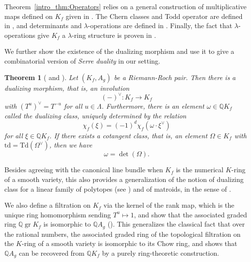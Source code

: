\documentclass[oneside]{amsart}
\theoremstyle{plain}
\newtheorem{theorem}{Theorem}[section]
\theoremstyle{definition}
\newcommand{\Q}{{\mathbb{Q}}}
\newcommand{\gr}{\operatorname{gr}}
\newcommand{\td}{{\mathrm{td}}}
\newcommand{\Td}{{\mathrm{Td}}}
\begin{document}
Theorem~\ref{intro_thm:Operators} relies on a general construction of multiplicative maps defined on $K_f$ given in  . The Chern classes and Todd operator are defined in , and determinants and $\lambda$-operations are defined in . Finally, the fact that $\lambda$-operations give $K_f$ a $\lambda$-ring structure is proven in .

We further show the existence of the dualizing morphism and use it to give a combinatorial version of \emph{Serre duality} in our setting.
\begin{theorem}[{ and }]\label{intro_thm:Serre-duality}
    Let $(K_f, A_g)$ be a Riemann-Roch pair. Then there is a \emph{dualizing morphism}, that is, an involution
    \[
        (-)^\vee \colon K_f\to K_f
    \]
    with $(T^u)^\vee=T^{-u}$ for all $u\in \Lambda$.
    Furthermore, there is an element $\omega \in \Q K_f$ called the \emph{dualizing class}, uniquely determined by the relation
    \[
        \chi_f(\xi) = (-1)^d\chi_f(\omega \cdot \xi^\vee)
    \]
    for all $\xi\in \Q K_f$.
    If there exists a \emph{cotangent class}, that is, an element $\Omega\in K_f$ with $\td=\Td(\Omega^\vee)$,
    then we have 
    \[
    \omega=\det(\Omega).
    \]
\end{theorem}
Besides agreeing with the canonical line bundle when $K_f$ is the numerical $K$-ring of a smooth variety, this also provides a generalization of the notion of dualizing class for a linear family of polytopes (see ) and of matroids, in the sense of \cite{Cheng2025,cheng2026tangent}.

We also define a filtration on $K_f$ via the kernel of the rank map, which is the unique ring homomorphism sending $T^u \mapsto 1$, and show that the associated graded ring $\Q \gr K_f$ is isomorphic to $\Q A_g$
(). This generalizes the classical fact that over the rational numbers, the associated graded ring of the topological filtration on the $K$-ring of a smooth variety is isomorphic to its Chow ring, and shows that $\Q A_g$
can be recovered from $\Q K_f$ by a purely ring-theoretic construction.
\end{document}
